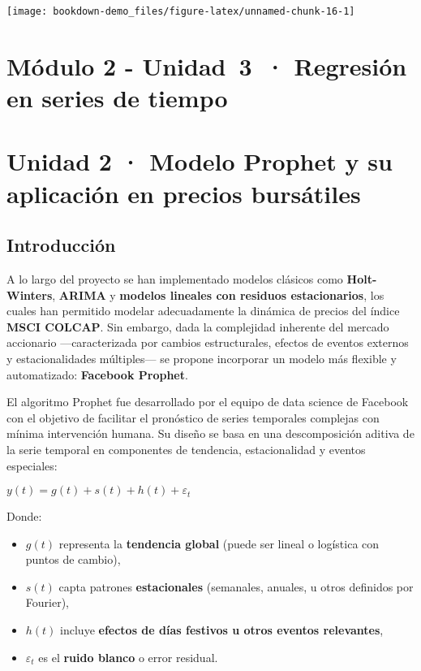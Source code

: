 \documentclass[
  11pt,
]{book}
\providecommand{\tightlist}{%
  \setlength{\itemsep}{0pt}\setlength{\parskip}{0pt}}
\begin{document}
\begin{center}\texttt{[image: bookdown-demo\_files/figure-latex/unnamed-chunk-16-1]} \end{center}

\chapter{Módulo 2 - Unidad~3~· Regresión en series de tiempo}\label{unidad6}

\chapter{Unidad 2 · Modelo Prophet y su aplicación en precios bursátiles}\label{unidad-2-modelo-prophet-y-su-aplicaciuxf3n-en-precios-bursuxe1tiles}

\section{Introducción}\label{introducciuxf3n-2}

A lo largo del proyecto se han implementado modelos clásicos como \textbf{Holt-Winters}, \textbf{ARIMA} y \textbf{modelos lineales con residuos estacionarios}, los cuales han permitido modelar adecuadamente la dinámica de precios del índice \textbf{MSCI COLCAP}. Sin embargo, dada la complejidad inherente del mercado accionario ---caracterizada por cambios estructurales, efectos de eventos externos y estacionalidades múltiples--- se propone incorporar un modelo más flexible y automatizado: \textbf{Facebook Prophet}.

El algoritmo Prophet fue desarrollado por el equipo de data science de Facebook con el objetivo de facilitar el pronóstico de series temporales complejas con mínima intervención humana. Su diseño se basa en una descomposición aditiva de la serie temporal en componentes de tendencia, estacionalidad y eventos especiales:

\(y(t) = g(t) + s(t) + h(t) + \varepsilon_t\)

Donde:

\begin{itemize}
\tightlist
\item
  \(g(t)\) representa la \textbf{tendencia global} (puede ser lineal o logística con puntos de cambio),
\item
  \(s(t)\) capta patrones \textbf{estacionales} (semanales, anuales, u otros definidos por Fourier),
\item
  \(h(t)\) incluye \textbf{efectos de días festivos u otros eventos relevantes},
\item
  \(\varepsilon_t\) es el \textbf{ruido blanco} o error residual.
\end{itemize}
\end{document}
